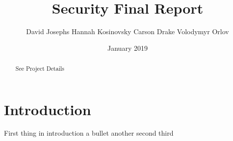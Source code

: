\documentclass{IEEEtran}
\title{Security Final Report}
\author{David Josephs Hannah Kosinovsky Carson Drake Volodymyr Orlov}
\date{January 2019}
\begin{document}
\maketitle
\begin{abstract}
See Project Details
\end{abstract}
\section{Introduction}
\begin{outline}
\1 First thing in introduction
\2 a bullet
\3 another
\1 second
\1 third
\end{outline}



\end{document}
